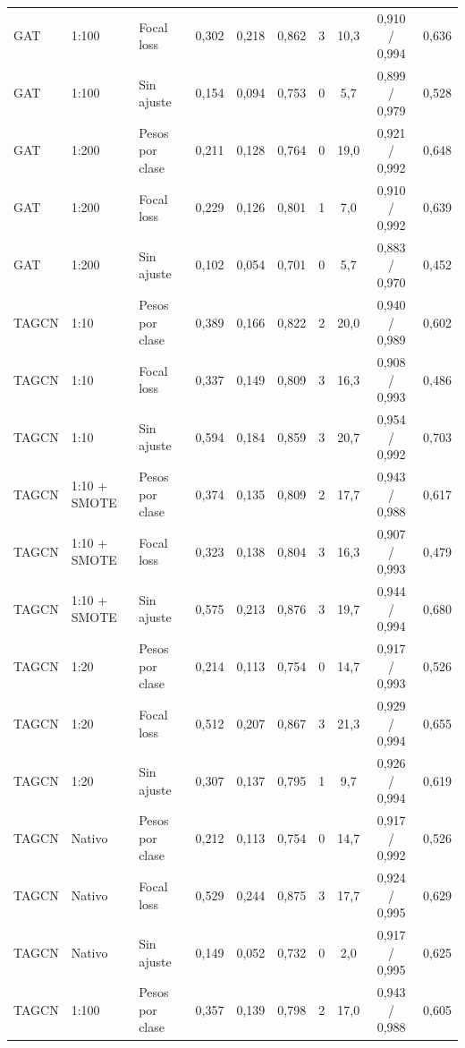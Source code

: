 \begin{longtable}{lllccccccc}
GAT & 1:100 & Focal loss & 0{,}302 & 0{,}218 & 0{,}862 & 3 & 10{,}3 & 0{,}910 / 0{,}994 & 0{,}636 \\
GAT & 1:100 & Sin ajuste & 0{,}154 & 0{,}094 & 0{,}753 & 0 & 5{,}7 & 0{,}899 / 0{,}979 & 0{,}528 \\
GAT & 1:200 & Pesos por clase & 0{,}211 & 0{,}128 & 0{,}764 & 0 & 19{,}0 & 0{,}921 / 0{,}992 & 0{,}648 \\
GAT & 1:200 & Focal loss & 0{,}229 & 0{,}126 & 0{,}801 & 1 & 7{,}0 & 0{,}910 / 0{,}992 & 0{,}639 \\
GAT & 1:200 & Sin ajuste & 0{,}102 & 0{,}054 & 0{,}701 & 0 & 5{,}7 & 0{,}883 / 0{,}970 & 0{,}452 \\
\midrule
TAGCN & 1:10 & Pesos por clase & 0{,}389 & 0{,}166 & 0{,}822 & 2 & 20{,}0 & 0{,}940 / 0{,}989 & 0{,}602 \\
TAGCN & 1:10 & Focal loss & 0{,}337 & 0{,}149 & 0{,}809 & 3 & 16{,}3 & 0{,}908 / 0{,}993 & 0{,}486 \\
TAGCN & 1:10 & Sin ajuste & 0{,}594 & 0{,}184 & 0{,}859 & 3 & 20{,}7 & 0{,}954 / 0{,}992 & 0{,}703 \\
TAGCN & 1:10 + SMOTE & Pesos por clase & 0{,}374 & 0{,}135 & 0{,}809 & 2 & 17{,}7 & 0{,}943 / 0{,}988 & 0{,}617 \\
TAGCN & 1:10 + SMOTE & Focal loss & 0{,}323 & 0{,}138 & 0{,}804 & 3 & 16{,}3 & 0{,}907 / 0{,}993 & 0{,}479 \\
TAGCN & 1:10 + SMOTE & Sin ajuste & 0{,}575 & 0{,}213 & 0{,}876 & 3 & 19{,}7 & 0{,}944 / 0{,}994 & 0{,}680 \\
TAGCN & 1:20 & Pesos por clase & 0{,}214 & 0{,}113 & 0{,}754 & 0 & 14{,}7 & 0{,}917 / 0{,}993 & 0{,}526 \\
TAGCN & 1:20 & Focal loss & 0{,}512 & 0{,}207 & 0{,}867 & 3 & 21{,}3 & 0{,}929 / 0{,}994 & 0{,}655 \\
TAGCN & 1:20 & Sin ajuste & 0{,}307 & 0{,}137 & 0{,}795 & 1 & 9{,}7 & 0{,}926 / 0{,}994 & 0{,}619 \\
TAGCN & Nativo & Pesos por clase & 0{,}212 & 0{,}113 & 0{,}754 & 0 & 14{,}7 & 0{,}917 / 0{,}992 & 0{,}526 \\
TAGCN & Nativo & Focal loss & 0{,}529 & 0{,}244 & 0{,}875 & 3 & 17{,}7 & 0{,}924 / 0{,}995 & 0{,}629 \\
TAGCN & Nativo & Sin ajuste & 0{,}149 & 0{,}052 & 0{,}732 & 0 & 2{,}0 & 0{,}917 / 0{,}995 & 0{,}625 \\
TAGCN & 1:100 & Pesos por clase & 0{,}357 & 0{,}139 & 0{,}798 & 2 & 17{,}0 & 0{,}943 / 0{,}988 & 0{,}605 \\

\end{longtable}
